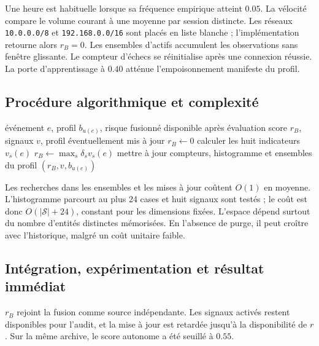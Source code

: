 \documentclass[11pt,a4paper,oneside]{report}
\theoremstyle{definition}
\theoremstyle{plain}
\begin{document}
Une heure est habituelle lorsque sa fréquence empirique atteint $0.05$. La
vélocité compare le volume courant à une moyenne par session distincte. Les
réseaux \texttt{10.0.0.0/8} et \texttt{192.168.0.0/16} sont placés en liste
blanche ; l'implémentation retourne alors $r_B=0$. Les ensembles d'actifs
accumulent les observations sans fenêtre glissante. Le compteur d'échecs se
réinitialise après une connexion réussie. La porte d'apprentissage à $0.40$
atténue l'empoisonnement manifeste du profil.

\subsection*{Procédure algorithmique et complexité}

\begin{algorithm}[H]
\caption{Évaluation et apprentissage prudent du profil UEBA}
\label{alg:ai-ro-ueba}
\begin{algorithmic}[1]
\Require événement $e$, profil $b_{u(e)}$, risque fusionné disponible après évaluation
\Ensure score $r_B$, signaux $v$, profil éventuellement mis à jour
  \State $r_B\leftarrow0$
\Else
  \State calculer les huit indicateurs $v_s(e)$
  \State $r_B\leftarrow\max_s\delta_sv_s(e)$
\EndIf
{}
  \State mettre à jour compteurs, histogramme et ensembles du profil
\EndIf
\State \Return $(r_B,v,b_{u(e)})$
\end{algorithmic}
\end{algorithm}

Les recherches dans les ensembles et les mises à jour coûtent $O(1)$ en moyenne. L'histogramme parcourt au plus 24 cases et huit signaux sont testés ; le coût est donc $O(|\mathcal{S}|+24)$, constant pour les dimensions fixées. L'espace dépend surtout du nombre d'entités distinctes mémorisées. En l'absence de purge, il peut croître avec l'historique, malgré un coût unitaire faible.

\subsection*{Intégration, expérimentation et résultat immédiat}

$r_B$ rejoint la fusion comme source indépendante. Les signaux activés restent disponibles pour l'audit, et la mise à jour est retardée jusqu'à la disponibilité de $r$. Sur la même archive, le score autonome a été seuillé à $0.55$.

\begin{table}[H]
\centering
\caption{Résultat archivé de l'UEBA, $n=300$, seuil $0.55$.}
\label{tab:method-ueba-results}
\small
{}
\end{table}
\end{document}
